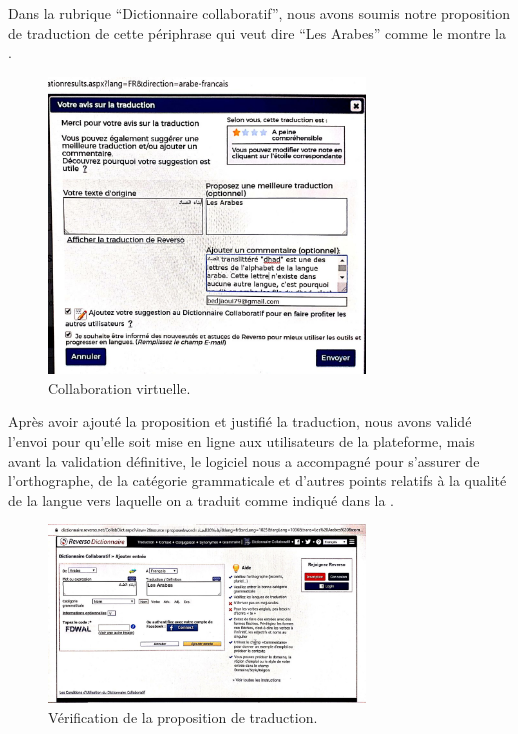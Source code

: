 \documentclass[french,english,brazil]{textolivre}
\begin{document}
Dans la rubrique “Dictionnaire collaboratif”, nous avons soumis notre proposition de traduction de cette périphrase qui veut dire “Les Arabes” comme le montre la .

\begin{figure}[htbp]
 \centering
 \includegraphics[width=0.75\textwidth]{figure06.png}
 \caption{Collaboration virtuelle.}
 \label{fig-06}
\end{figure}

Après avoir ajouté la proposition et justifié la traduction, nous avons validé l’envoi pour qu’elle soit mise en ligne aux utilisateurs de la plateforme, mais avant la validation définitive, le logiciel nous a accompagné pour s’assurer de l’orthographe, de la catégorie grammaticale et d’autres points relatifs à la qualité de la langue vers laquelle on a traduit comme indiqué dans la . 

\begin{figure}[htbp]
 \centering
 \includegraphics[width=0.75\textwidth]{figure07.png}
 \caption{Vérification de la proposition de traduction.}
 \label{fig-07}
\end{figure}
\end{document}
